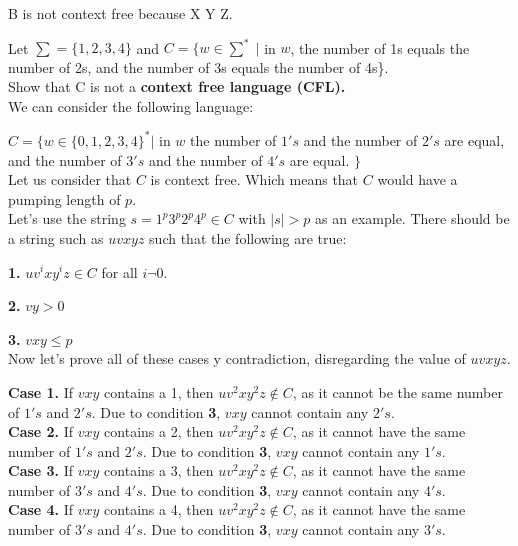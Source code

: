 \documentclass[12pt]{article}
\begin{document}
B is not context free because X Y Z.

 Let $\sum = \{1, 2, 3, 4\}$ and $C = \{w \in \sum^* \; | $ in $w$, the number of 1s 
equals the number of 2s, and the number of 3s equals the number of 4s\}. \\
Show that C is not a \textbf{context free language (CFL).} \\

We can consider the following language:

$C = \{ w \in \{0, 1, 2, 3, 4 \}^* | $ in $w$ the number of $1's$ and the number of
$2's$ are equal, and the number of $3's$ and the number of $4's$ are equal. $\}$ \\

Let us consider that $C$ is context free. Which means that $C$ would have a pumping
length of $p$. \\

Let's use the string $s = 1^p 3^p 2^p 4^p \in C$ with $|s| > p$ as an example.
There should be a string such as $uvxyz$ such that the following are true:

\textbf{1.} $u v^i x y^i z \in C$ for all $i \neg 0$.

\textbf{2.} $vy > 0$

\textbf{3.} $vxy \le p$ \\

Now let's prove all of these cases y contradiction, disregarding the value of $uvxyz$.

\textbf{Case 1.} If $vxy$ contains a 1, then $u v^2 x y^2 z \notin C$, as it cannot
be the same number of $1's$ and $2's$. Due to condition \textbf{3}, $vxy$ cannot
contain any $2's$. \\

\textbf{Case 2.} If $vxy$ contains a 2, then $u v^2 x y^2 z \notin C$, as it cannot
have the same number of $1's$ and $2's$. Due to condition \textbf{3}, $vxy$ cannot
contain any $1's$. \\

\textbf{Case 3.} If $vxy$ contains a 3, then $u v^2 x y^2 z \notin C$, as it cannot
have the same number of $3's$ and $4's$. Due to condition \textbf{3}, $vxy$ cannot
contain any $4's$. \\

\textbf{Case 4.} If $vxy$ contains a 4, then $u v^2 x y^2 z \notin C$, as it cannot
have the same number of $3's$ and $4's$. Due to condition \textbf{3}, $vxy$ cannot
contain any $3's$. \\
\end{document}
